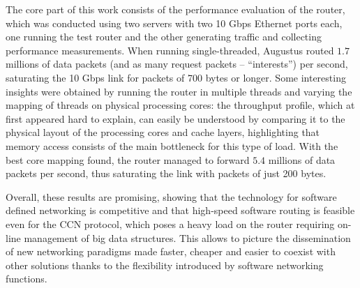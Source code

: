 \documentclass[11pt,a4paper,twoside,titlepage,openany]{book}
\begin{document}
The core part of this work consists of the performance evaluation of the router, which was conducted using two servers with two 10 Gbps Ethernet ports each, one running the test router and the other generating traffic and collecting performance measurements. When running single-threaded, Augustus routed $1.7$ millions of data packets (and as many request packets -- ``interests'') per second, saturating the 10 Gbps link for packets of 700 bytes or longer. Some interesting insights were obtained by running the router in multiple threads and varying the mapping of threads on physical processing cores: %
the throughput profile, which at first appeared hard to explain, can easily be understood by comparing it to the physical layout of the processing cores and cache layers, highlighting that memory access consists of the main bottleneck for this type of load.
With the best core mapping found, the router managed to forward $5.4$ millions of data packets per second, thus saturating the link with packets of just 200 bytes.

Overall, these results are promising, showing that the technology for software defined networking is competitive and that high-speed software routing is feasible even for the CCN protocol, which poses a heavy load on the router requiring on-line management of big data structures.
This allows to picture the dissemination of new networking paradigms made faster, cheaper and easier to coexist with other solutions thanks to the flexibility introduced by software networking functions.




\end{document}
